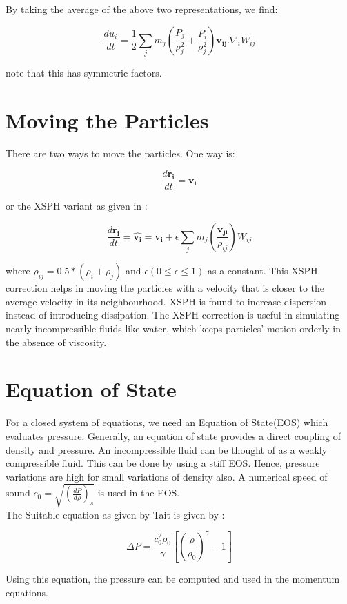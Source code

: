 \noindent
By taking the average of the above two representations, we find:

\begin{equation}
 \frac{du_i}{dt} = \frac{1}{2} \sum_j m_j \left( \frac{P_j}{\rho_j^2} + \frac{P_i}{\rho_j^2}\right)\mathbf{v_{ij}}.\nabla_i W_{ij}
\end{equation}

\noindent
note that this has symmetric factors.


\section{Moving the Particles}

There are two ways to move the particles. One way is:

\begin{equation}
 \frac{d\mathbf{r_i}}{dt} = \mathbf{v_i}
\end{equation}

\noindent
or the XSPH variant as given in \citep{Monaghan1983}:

\begin{equation}
\frac{d\mathbf{r_i}}{dt} = \hat {\mathbf{v_i}} = \mathbf{v_i} + \epsilon \sum_j m_j \left(\frac{\mathbf{v_{ji}}}{\rho_{ij}}\right) W_{ij}
\end{equation}

\noindent
where $\rho_{ij} = 0.5*(\rho_i + \rho_j)$ and $\epsilon (0 \leq \epsilon \leq 1)$ as a constant. 
This XSPH correction helps in moving the particles with a velocity that is closer to the
average velocity in its neighbourhood. XSPH is found to increase dispersion instead of introducing
dissipation. The XSPH correction is useful in simulating nearly incompressible fluids like water, which keeps 
particles' motion orderly in the absence of viscosity.

\section{Equation of State}

For a closed system of equations, we need an Equation of State(EOS) which evaluates pressure.
Generally, an equation of state provides a direct coupling of density and pressure. An incompressible fluid 
can be thought of as a weakly compressible fluid. This can be done by using a stiff EOS.
Hence, pressure variations are high for small variations of density also. A numerical speed of sound
$c_0 = \sqrt{\left(\frac{dP}{d\rho}\right)_s}$ is used in the EOS.\\

The Suitable equation as given by Tait is given by :

\begin{equation}
 \Delta P = \frac{c_0^2 \rho_0}{\gamma} \left[ \left( \frac{\rho}{\rho_0} \right)^{\gamma} - 1 \right]
\end{equation}

\noindent
Using this equation, the pressure can be computed and used in the momentum equations.

